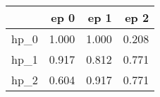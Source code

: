 \begin{tabular}{lrrr}
\toprule
{} &   ep 0 &   ep 1 &   ep 2 \\
\midrule
hp\_0 &  1.000 &  1.000 &  0.208 \\
hp\_1 &  0.917 &  0.812 &  0.771 \\
hp\_2 &  0.604 &  0.917 &  0.771 \\
\bottomrule
\end{tabular}
